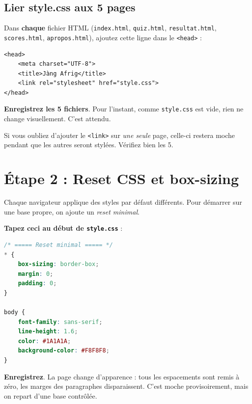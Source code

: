 \documentclass[11pt,a4paper]{article}
\newcommand{\cmark}{\ding{51}}
\begin{document}
\subsection{Lier style.css aux 5 pages}

Dans \textbf{chaque} fichier HTML (\texttt{index.html}, \texttt{quiz.html},
\texttt{resultat.html}, \texttt{scores.html}, \texttt{apropos.html}),
ajoutez cette ligne dans le \texttt{<head>} :

\begin{lstlisting}[language=HTML5]
<head>
    <meta charset="UTF-8">
    <title>Jàng Afrig</title>
    <link rel="stylesheet" href="style.css">
</head>
\end{lstlisting}

\textbf{Enregistrez les 5 fichiers}. Pour l'instant, comme \texttt{style.css}
est vide, rien ne change visuellement. C'est attendu.

\begin{retenirbox}
Si vous oubliez d'ajouter le \texttt{<link>} sur \emph{une seule} page,
celle-ci restera moche pendant que les autres seront stylées. Vérifiez
bien les 5.
\end{retenirbox}

\section{Étape 2 : Reset CSS et box-sizing}

Chaque navigateur applique des styles par défaut différents. Pour démarrer
sur une base propre, on ajoute un \emph{reset minimal}.

\textbf{Tapez ceci au début de \texttt{style.css}} :

\begin{lstlisting}[language=CSS]
/* ===== Reset minimal ===== */
* {
    box-sizing: border-box;
    margin: 0;
    padding: 0;
}

body {
    font-family: sans-serif;
    line-height: 1.6;
    color: #1A1A1A;
    background-color: #F8F8F8;
}
\end{lstlisting}

\textbf{Enregistrez}. La page change d'apparence : tous les espacements
sont remis à zéro, les marges des paragraphes disparaissent. C'est moche
provisoirement, mais on repart d'une base contrôlée. \cmark
\end{document}
